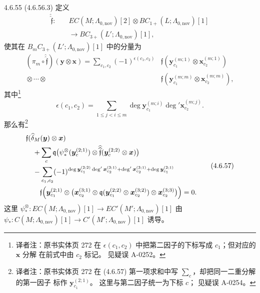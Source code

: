 \begin{proposition}{4.6.55}
\noindent\textup{(4.6.56.3)}
定义
\[
\begin{aligned}
\widehat{\widehat{\mathfrak f}}\colon\quad
&EC(M;\Lambda_{0,\mathrm{nov}})[2]
\otimes BC_{1+}(L;\Lambda_{0,\mathrm{nov}})[1]\\
&\longrightarrow BC_{3+}(L';\Lambda_{0,\mathrm{nov}})[1],
\end{aligned}
\]
使其在
$B_mC_{3+}(L';\Lambda_{0,\mathrm{nov}})[1]$
中的分量为
\[
\begin{aligned}
(\pi_m\circ\widehat{\widehat{\mathfrak f}})
 (\boldsymbol y\otimes\boldsymbol x)
=\sum_{c_1,c_2}(-1)^{\epsilon(c_1,c_2)}
&\mathfrak f(
 \boldsymbol y_{c_1}^{(m;1)}
 \otimes\boldsymbol x_{c_2}^{(m;1)})\\[-1mm]
{}\otimes\cdots\otimes{}&
\mathfrak f(
 \boldsymbol y_{c_1}^{(m;m)}
 \otimes\boldsymbol x_{c_2}^{(m;m)}),
\end{aligned}
\]
其中\footnote{译者注：原书实体页 272
在 $\epsilon(c_1,c_2)$ 中把第二因子的下标写成
$c_1$；但对应的 $\boldsymbol x$ 分解
在前式中由 $c_2$ 标记。
见疑误 A-0252。}
\[
\epsilon(c_1,c_2)
=\sum_{1\le j<i\le m}
\deg\boldsymbol y_{c_1}^{(m;i)}
\deg'\boldsymbol x_{c_2}^{(m;j)} .
\]
那么有\footnote{译者注：原书实体页 272
在 (4.6.57) 第一项求和中写
$\sum_c$，却把同一二重分解的第一因子
标作 $\boldsymbol y_{c_1}^{(2;1)}$。
这里与第二因子统一为下标 $c$；
见疑误 A-0254。}
\begin{equation}
\begin{aligned}
&\mathfrak f(\widehat\delta_M(\boldsymbol y)
             \otimes\boldsymbol x)\\
&\quad+\sum_c
\mathfrak q\bigl(
 \psi_*^\otimes(\boldsymbol y_c^{(2;1)})
 \otimes
 \widehat{\widehat{\mathfrak f}}
 (\boldsymbol y_c^{(2;2)}\otimes\boldsymbol x)
 \bigr)\\
&\quad-\sum_{c_1,c_2}
(-1)^{
 \deg\boldsymbol y_{c_1}^{(2;2)}
 \deg'\boldsymbol x_{c_2}^{(3;1)}
 +\deg'\boldsymbol x_{c_2}^{(3;1)}
 +\deg\boldsymbol y_{c_1}^{(2;1)}
}\\
&\qquad\mathfrak f\Bigl(
 \boldsymbol y_{c_1}^{(2;1)}\otimes
 \bigl(
 \boldsymbol x_{c_2}^{(3;1)}
 \otimes\mathfrak q(
   \boldsymbol y_{c_1}^{(2;2)}
   \otimes\boldsymbol x_{c_2}^{(3;2)})
 \otimes\boldsymbol x_{c_2}^{(3;3)}
 \bigr)\Bigr)=0 .
\end{aligned}
\tag{4.6.57}\label{eq:4-6-57}
\end{equation}
这里
$\psi_*^\otimes\colon
EC(M;\Lambda_{0,\mathrm{nov}})[1]
\to EC'(M';\Lambda_{0,\mathrm{nov}})[1]$
由
$\psi_*\colon C(M;\Lambda_{0,\mathrm{nov}})[1]
\to C'(M';\Lambda_{0,\mathrm{nov}})[1]$
诱导。
\end{proposition}

